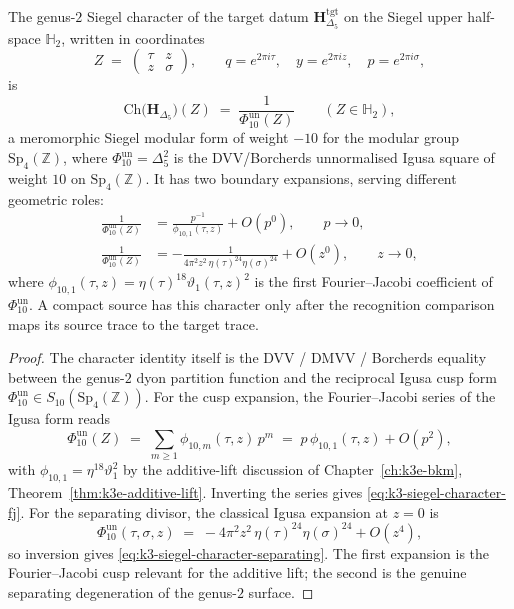 \begin{theorem}
\label{thm:k3-siegel-character}
The genus-$2$ Siegel character of the target datum
$\mathbf{H}_{\Delta_5}^{\mathrm{tgt}}$ on the Siegel upper
half-space $\mathbb{H}_2$, written in coordinates
\[
 Z
 \;=\;
 \begin{pmatrix}
 \tau & z \\
 z & \sigma
 \end{pmatrix},
 \qquad
 q=e^{2\pi i\tau},
 \quad
 y=e^{2\pi iz},
 \quad
 p=e^{2\pi i\sigma},
\]
is
\[
 \mathrm{Ch}\bigl(\mathbf{H}_{\Delta_5}\bigr)(Z)
 \;=\;
 \frac{1}{\Phi_{10}^{\mathrm{un}}(Z)}
 \qquad
 (Z\in\mathbb{H}_2),
\]
a meromorphic Siegel modular form of weight $-10$ for the modular group
$\mathrm{Sp}_4(\mathbb{Z})$, where
\(\Phi_{10}^{\mathrm{un}}=\Delta_5^2\) is the DVV/Borcherds
unnormalised Igusa square of weight $10$ on $\mathrm{Sp}_4(\mathbb{Z})$.
It has two boundary expansions,
serving different geometric roles:
\begin{align}
 \frac{1}{\Phi_{10}^{\mathrm{un}}(Z)}
 &=
 \frac{p^{-1}}{\phi_{10,1}(\tau,z)} + O(p^0),
 \qquad p\to 0,
 \label{eq:k3-siegel-character-fj}
 \\
 \frac{1}{\Phi_{10}^{\mathrm{un}}(Z)}
 &=
 -\frac{1}{4\pi^2 z^2\,\eta(\tau)^{24}\eta(\sigma)^{24}} + O(z^0),
 \qquad z\to 0,
 \label{eq:k3-siegel-character-separating}
\end{align}
where $\phi_{10,1}(\tau,z)=\eta(\tau)^{18}\vartheta_1(\tau,z)^2$ is the first
Fourier--Jacobi coefficient of \(\Phi_{10}^{\mathrm{un}}\).
A compact source has this character only after the recognition comparison
maps its source trace to the target trace.
\end{theorem}

\begin{proof}
The character identity itself is the DVV / DMVV / Borcherds equality between the genus-$2$
dyon partition function and the reciprocal Igusa cusp form
\(\Phi_{10}^{\mathrm{un}}\in S_{10}(\mathrm{Sp}_4(\mathbb{Z}))\). For the cusp expansion,
the Fourier--Jacobi series of the Igusa form reads
\[
 \Phi_{10}^{\mathrm{un}}(Z)
 \;=\;
 \sum_{m\geq 1}\phi_{10,m}(\tau,z)\,p^m
 \;=\;
 p\,\phi_{10,1}(\tau,z) + O(p^2),
\]
with $\phi_{10,1}=\eta^{18}\vartheta_1^2$ by the additive-lift discussion of
Chapter~\ref{ch:k3e-bkm}, Theorem~\ref{thm:k3e-additive-lift}. Inverting the series gives
\eqref{eq:k3-siegel-character-fj}. For the separating divisor, the classical Igusa
expansion at $z=0$ is
\[
 \Phi_{10}^{\mathrm{un}}(\tau,\sigma,z)
 \;=\;
 -4\pi^2 z^2\,\eta(\tau)^{24}\eta(\sigma)^{24} + O(z^4),
\]
so inversion gives \eqref{eq:k3-siegel-character-separating}. The first expansion is
the Fourier--Jacobi cusp relevant for the additive lift; the second is the genuine
separating degeneration of the genus-$2$ surface.
\end{proof}

